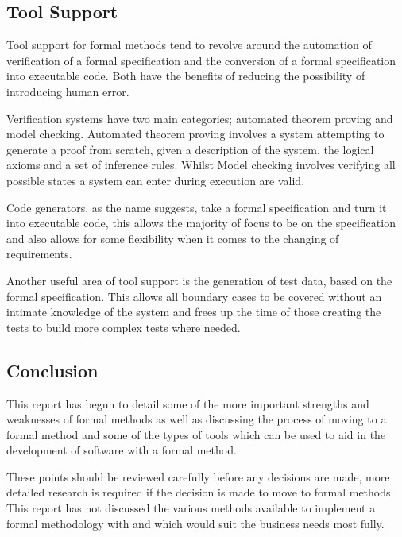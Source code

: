 \documentclass[a4paper, notitlepage, fleqn]{article}
\begin{document}
\subsection*{Tool Support}
Tool support for formal methods tend to revolve around the automation of verification of a formal
specification and the conversion of a formal specification into executable code. Both have the
benefits of reducing the possibility of introducing human error.

Verification systems have two main categories; automated theorem proving and model checking. 
Automated theorem proving involves a system attempting to generate a proof from scratch, given a 
description of the system, the logical axioms and a set of inference rules. Whilst Model checking 
involves verifying all possible states a system can enter during execution are valid.

Code generators, as the name suggests, take a formal specification and turn it into executable 
code, this allows the majority of focus to be on the specification and also allows for some 
flexibility when it comes to the changing of requirements.

Another useful area of tool support is the generation of test data, based on the formal 
specification. This allows all boundary cases to be covered without an intimate knowledge of the
system and frees up the time of those creating the tests to build more complex tests where needed.

\subsection*{Conclusion}
This report has begun to detail some of the more important strengths and weaknesses of formal 
methods as well as discussing the process of moving to a formal method and some of the types of
tools which can be used to aid in the development of software with a formal method.

These points should be reviewed carefully before any decisions are made, more detailed research is
required if the decision is made to move to formal methods. This report has not discussed the 
various methods available to implement a formal methodology with and which would suit the business
needs most fully.

\newpage


\end{document}
